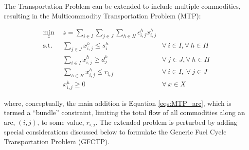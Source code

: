 The Transportation Problem can be extended to include multiple commodities,
resulting in the Multicommodity Transportation Problem (MTP):

\begin{subequations}\label{eqs:MTP}
  \begin{align}
    \min_{z} \:\: & 
    z = \sum_{i \in I}\sum_{j \in J}\sum_{h \in H} c^h_{i,j} x^h_{i,j} 
    & \label{eqs:MTP_obj} \\
    \text{s.t.} \:\: &
    \sum_{j \in J} x^h_{i,j} \leq s^h_{i} 
    &
    \forall \: i \in I, \forall \: h \in H \label{eqs:MTP_sup} \\
    &
    \sum_{i \in I} x^h_{i,j} \geq d^h_{j} 
    & 
    \forall \: j \in J, \forall \: h \in H \label{eqs:MTP_dem} \\
    &
    \sum_{h \in H} x^h_{i,j} \leq r_{i,j}
    & 
    \forall \: i \in I, \:\forall \: j \in J \label{eqs:MTP_arc} \\
    &
    x^h_{i,j} \geq 0
    &
    \forall \: x \in X \label{eqs:MTP_x}
  \end{align}
\end{subequations}

where, conceptually, the main addition is Equation \ref{eqs:MTP_arc}, which is
termed a ``bundle'' constraint, limiting the total flow of all commodities
along an arc, $(i,j)$, to some value, $r_{i,j}$. The extended problem is perturbed by adding special
considerations discussed below to formulate the Generic Fuel Cycle
Transportation Problem (GFCTP). 

